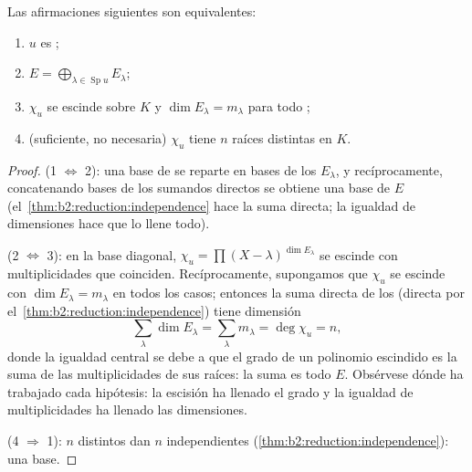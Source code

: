 \begin{theorem}\label{thm:b2:reduction:diagcrit}
Las afirmaciones siguientes son equivalentes:
\begin{enumerate}
  \item $u$ es ;
  \item $E = \bigoplus_{\lambda \in \operatorname{Sp} u} E_\lambda$;
  \item $\chi_u$ se escinde sobre $K$ y $\dim E_\lambda = m_\lambda$
        para todo ;
  \item (suficiente, no necesaria) $\chi_u$ tiene $n$ raíces
        distintas en $K$.
\end{enumerate}
\end{theorem}

\begin{proof}
(1 $\iff$ 2): una base de  se reparte en bases de
los $E_\lambda$, y recíprocamente, concatenando bases de los sumandos
directos se obtiene una base de $E$
(el~\cref{thm:b2:reduction:independence} hace la suma directa; la
igualdad de dimensiones hace que lo llene todo).

(2 $\iff$ 3): en la base diagonal, $\chi_u = \prod (X -
\lambda)^{\dim E_\lambda}$ se escinde con multiplicidades que
coinciden. Recíprocamente, supongamos que $\chi_u$ se escinde con
$\dim E_\lambda = m_\lambda$ en todos los casos; entonces la suma
directa de los  (directa por el~\cref{thm:b2:reduction:independence}) tiene dimensión
\[
\sum_{\lambda}\dim E_\lambda = \sum_{\lambda} m_\lambda =
\deg\chi_u = n ,
\]
donde la igualdad central se debe a que el grado de un polinomio
escindido es la suma de las multiplicidades de sus raíces: la
suma es todo $E$. Obsérvese dónde ha trabajado cada hipótesis: la
escisión ha llenado el grado y la igualdad de multiplicidades ha
llenado las dimensiones.

(4 $\Rightarrow$ 1): $n$  distintos dan $n$
 independientes
(\cref{thm:b2:reduction:independence}): una base.
\end{proof}

